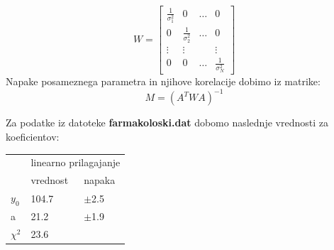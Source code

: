\documentclass[slovene,11pt,a4paper]{article}
\numberwithin{equation}{section} %
\numberwithin{figure}{section} %
\numberwithin{table}{section} %
\begin{document}
\begin{equation*}
W=
\begin{bmatrix}
    \frac{1}{\sigma_1^2} & 0 & \dots & 0 \\
    0 & \frac{1}{\sigma_2^2} & \dots & 0 \\
    \vdots & \vdots &  & \vdots  \\
    0 & 0 & \dots & \frac{1}{\sigma_N^2}
\end{bmatrix}
\end{equation*}
Napake posameznega parametra in njihove korelacije dobimo iz matrike:
\begin{equation}
M=(A^T W A)^{-1}
\end{equation}


Za podatke iz datoteke \textbf{farmakoloski.dat} dobomo naslednje vrednosti za koeficientov:
\begin{table}[h]
\centering
\label{tabela-1}
\begin{tabular}{l|l|l|}
\cline{2-3}
                             & \multicolumn{2}{l|}{linearno prilagajanje} \\ \cline{2-3} 
                             & vrednost             & napaka              \\ \hline
\multicolumn{1}{|l|}{$y_0$}  & 104.7               & $\pm$2.5          \\ \hline
\multicolumn{1}{|l|}{a}      & 21.2                 & $\pm$1.9          \\ \hline
\multicolumn{1}{|l|}{$\chi^2$} & 23.6                &                  \\  \hline
\end{tabular}
\end{table}
\end{document}
